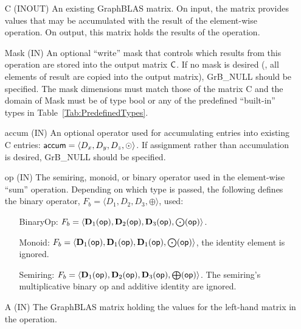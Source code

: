 \begin{itemize}[leftmargin=1.1in]
    \item[{\sf C}]    ({\sf INOUT}) An existing GraphBLAS matrix.  On input,
    the matrix provides values that may be accumulated with the result of the
    element-wise operation.  On output, this matrix holds the results of the
    operation.

    \item[{\sf Mask}]  ({\sf IN}) An optional ``write'' mask that controls which
    results from this operation are stored into the output matrix
    ${\sf C}$.  If no mask is desired (\ie, all elements
    of result are copied into the output matrix), {\sf GrB\_NULL}
    should be specified. The mask dimensions must match those of the
    matrix {\sf C} and the domain of {\sf Mask} must be
    of type {\sf bool} or any of the predefined ``built-in'' types in
    Table~\ref{Tab:PredefinedTypes}.

    \item[{\sf accum}] ({\sf IN}) An optional operator used for accumulating
    entries into existing {\sf C} entries: ${\sf accum} = \langle D_x,
    D_y, D_z,\odot \rangle$. If assignment rather than accumulation is
    desired, {\sf GrB\_NULL} should be specified.

    \item[{\sf op}]    ({\sf IN}) The semiring, monoid, or binary operator 
    used in the element-wise ``sum'' operation.  Depending on which type is
    passed, the following defines the binary operator, 
    $F_b=\langle D_1,D_2,D_3,\oplus\rangle$, used:
    \begin{itemize}[leftmargin=1.1in]
    \item[BinaryOp:] $F_b = \langle \bold{D}_1({\sf op}), \bold{D}_2({\sf op}),
    \bold{D}_3({\sf op}),\bold{\bigodot}({\sf op})\rangle$.  
    \item[Monoid:] $F_b = \langle \bold{D}_1({\sf op}), \bold{D}_1({\sf op}),
    \bold{D}_1({\sf op}),\bold{\bigodot}({\sf op})\rangle$,
    the identity element is ignored. 
    \item[Semiring:] $F_b = \langle \bold{D}_1({\sf op}), \bold{D}_2({\sf op}),
    \bold{D}_3({\sf op}),\bold{\bigoplus}({\sf op})\rangle$.  The semiring's 
    multiplicative binary op and additive identity are ignored.
    \end{itemize}
    
    \item[{\sf A}]     ({\sf IN}) The GraphBLAS matrix holding the values for
    the left-hand matrix in the operation.
    

\end{itemize}
